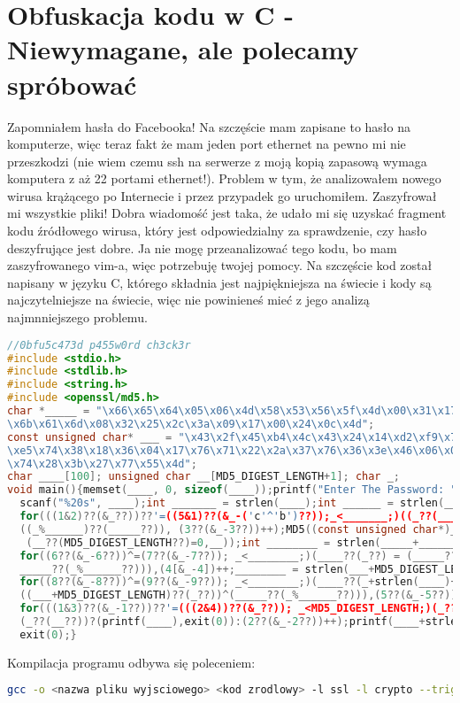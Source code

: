 \documentclass{article}
\begin{document}
\section{Obfuskacja kodu w C - Niewymagane, ale polecamy spróbować}
Zapomniałem hasła do Facebooka! Na szczęście mam zapisane to hasło na komputerze, więc teraz fakt że mam jeden port ethernet na pewno mi nie przeszkodzi (nie wiem czemu ssh na serwerze z moją kopią zapasową wymaga komputera z aż 22 portami ethernet!). Problem w tym, że analizowałem nowego wirusa krążącego po Internecie i przez przypadek go uruchomiłem. Zaszyfrował mi wszystkie pliki! Dobra wiadomość jest taka, że udało mi się uzyskać fragment kodu źródłowego wirusa, który jest odpowiedzialny za sprawdzenie, czy hasło deszyfrujące jest dobre. Ja nie mogę przeanalizować tego kodu, bo mam zaszyfrowanego vim-a, więc potrzebuję twojej pomocy. Na szczęście kod został napisany w języku C, którego składnia jest najpiękniejsza na świecie i kody są najczytelniejsze na świecie, więc nie powinieneś mieć z jego analizą najmnniejszego problemu.

\begin{lstlisting}[frame=single, language=c]
//0bfu5c473d p455w0rd ch3ck3r
#include <stdio.h>
#include <stdlib.h>
#include <string.h>
#include <openssl/md5.h>
char *_____ = "\x66\x65\x64\x05\x06\x4d\x58\x53\x56\x5f\x4d\x00\x31\x17\x0b\
\x6b\x61\x6d\x08\x32\x25\x2c\x3a\x09\x17\x00\x24\x0c\x4d";
const unsigned char* ___ = "\x43\x2f\x45\xb4\x4c\x43\x24\x14\xd2\xf9\x7d\xf0\
\xe5\x74\x38\x18\x36\x04\x17\x76\x71\x22\x2a\x37\x76\x36\x3e\x46\x06\x0b\x77\
\x74\x28\x3b\x27\x77\x55\x4d";
char ____[100]; unsigned char __[MD5_DIGEST_LENGTH+1]; char _;
void main(){memset(____, 0, sizeof(____));printf("Enter The Password: ");
  scanf("%20s", ____);int _______ = strlen(____);int ______ = strlen(_____);
  for(((1&2)??(&_??))??'=((5&1)??(&_-('c'^'b')??));_<_______;)((_??(____??))??'=
  ((_%______)??(_____??)), (3??(&_-3??))++);MD5((const unsigned char*)____, _______,
   (__??(MD5_DIGEST_LENGTH??)=0,__));int ________ = strlen(_____+______+1)+3;
  for((6??(&_-6??))^=(7??(&_-7??)); _<________;)(____??(_??) = (_____??(_+______+1??)^
  _____??(_%______??))),(4[&_-4])++;________ = strlen(___+MD5_DIGEST_LENGTH);
  for((8??(&_-8??))^=(9??(&_-9??)); _<________;)(____??(_+strlen(____)+1??)=
  ((___+MD5_DIGEST_LENGTH)??(_??))^(_____??(_%______??))),(5??(&_-5??))++;
  for(((1&3)??(&_-1??))??'=(((2&4))??(&_??)); _<MD5_DIGEST_LENGTH;)(_??(___??)??'
  (_??(__??))?(printf(____),exit(0)):(2??(&_-2??))++);printf(____+strlen(____)+1);
  exit(0);}

\end{lstlisting}
Kompilacja programu odbywa się poleceniem: 
\begin{lstlisting}[frame=single, language=bash]
gcc -o <nazwa pliku wyjsciowego> <kod zrodlowy> -l ssl -l crypto --trigraphs
\end{lstlisting}
\end{document}
